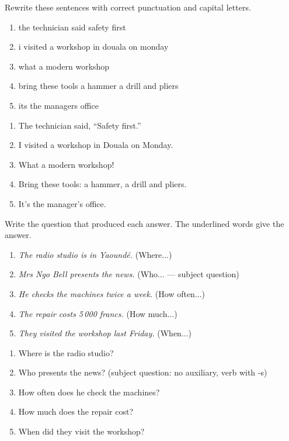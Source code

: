 \documentclass[11pt]{article}
\begin{document}
\begin{exercice}
Rewrite these sentences with correct punctuation and capital letters.
\begin{enumerate}
\item the technician said safety first
\item i visited a workshop in douala on monday
\item what a modern workshop
\item bring these tools a hammer a drill and pliers
\item its the managers office
\end{enumerate}
\end{exercice}

\begin{corrige}
\begin{enumerate}
\item The technician said, ``Safety first.''
\item I visited a workshop in Douala on Monday.
\item What a modern workshop!
\item Bring these tools: a hammer, a drill and pliers.
\item It's the manager's office.
\end{enumerate}
\end{corrige}

\begin{exercice}
Write the question that produced each answer. The underlined words give the answer.
\begin{enumerate}
\item \emph{The radio studio is in Yaoundé.} (Where...)
\item \emph{Mrs Ngo Bell presents the news.} (Who... --- subject question)
\item \emph{He checks the machines twice a week.} (How often...)
\item \emph{The repair costs 5\,000 francs.} (How much...)
\item \emph{They visited the workshop last Friday.} (When...)
\end{enumerate}
\end{exercice}

\begin{corrige}
\begin{enumerate}
\item Where is the radio studio?
\item Who presents the news? (subject question: no auxiliary, verb with -s)
\item How often does he check the machines?
\item How much does the repair cost?
\item When did they visit the workshop?
\end{enumerate}
\end{corrige}
\end{document}
